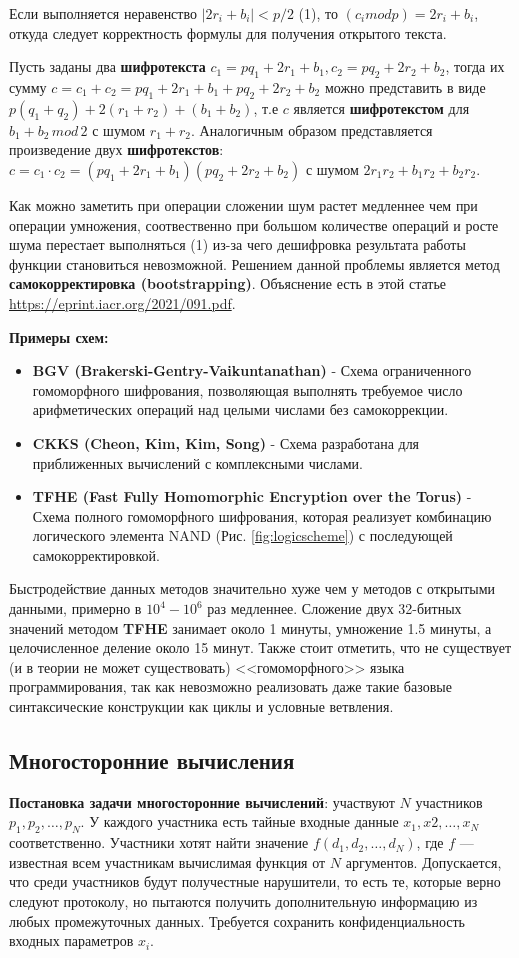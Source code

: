 Если выполняется неравенство $|2r_i+b_i| < p/2$ (1), то $(c_i mod p) = 2r_i + b_i$, откуда следует корректность формулы для получения открытого текста.

Пусть заданы два \textbf{шифротекста} $c_1 = pq_1+2r_1+b_1, c_2 = pq_2+2r_2+b_2$, тогда их сумму $c = c_1+c_2 = pq_1+2r_1+b_1 + pq_2+2r_2+b_2$ можно представить в виде $p(q_1+q_2) + 2(r_1+r_2) + (b_1 + b_2)$, т.е $c$ является \textbf{шифротекстом} для $b_1 + b_2 \, mod \, 2$ с шумом $r_1 + r_2$. Аналогичным образом представляется произведение двух \textbf{шифротекстов}: $c = c_1 \cdot c_2 = (pq_1+2r_1+b_1)(pq_2+2r_2+b_2)$ с шумом $2r_1r_2 + b_1r_2 + b_2r_2$.

Как можно заметить при операции сложении шум растет медленнее чем при операции умножения, соотвественно при большом количестве операций и росте шума перестает выполняться (1) из-за чего дешифровка результата работы функции становиться невозможной. Решением данной проблемы является метод \textbf{самокорректировка (bootstrapping)}. Объяснение есть в этой статье \url{https://eprint.iacr.org/2021/091.pdf}.

\textbf{Примеры схем:}
\begin{itemize}
\item \textbf{BGV (Brakerski-Gentry-Vaikuntanathan)} - Схема ограниченного гомоморфного шифрования, позволяющая выполнять требуемое число арифметических операций над целыми числами без самокоррекции. 
\item \textbf{CKKS (Cheon, Kim, Kim, Song)} - Схема разработана для приближенных вычислений с комплексными числами.
\item \textbf{TFHE (Fast Fully Homomorphic Encryption over the Torus)} - Схема полного гомоморфного шифрования, которая реализует комбинацию логического элемента NAND (Рис. \ref{fig:logicscheme}) с последующей самокорректировкой. 
\end{itemize}

Быстродействие данных методов значительно хуже чем у методов с открытыми данными, примерно в $10^4-10^6$ раз медленнее. Сложение двух 32-битных значений методом \textbf{TFHE} занимает около 1 минуты, умножение 1.5 минуты, а целочисленное деление около 15 минут. Также стоит отметить, что не существует (и в теории не может существовать) <<гомоморфного>> языка программирования, так как невозможно реализовать даже такие базовые синтаксические конструкции как циклы и условные ветвления. 

\subsection{Многосторонние вычисления}
\textbf{Постановка задачи многосторонние вычислений}: участвуют $N$ участников $p_1, p_2, \dots, p_N$. У каждого участника есть тайные входные данные $x_1, x2, \dots, x_N$ соответственно. Участники хотят найти значение $f(d_1, d_2, \dots, d_N)$, где $f$ — известная всем участникам вычислимая функция от $N$ аргументов. Допускается, что среди участников будут получестные нарушители, то есть те, которые верно следуют протоколу, но пытаются получить дополнительную информацию из любых промежуточных данных. Требуется сохранить конфиденциальность входных параметров $x_i$. 

